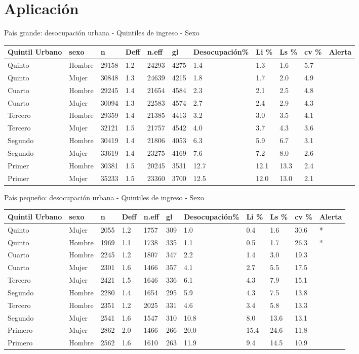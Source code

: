 \hypertarget{aplicacion}{%
\section{Aplicación}\label{aplicacion}}

País grande: desocupación urbana - Quintiles de ingreso - Sexo

\begin{longtable}[]{@{}lllllllllll@{}}
\toprule
Quintil Urbano & sexo & n & Deff & n.eff & gl & Desocupación\% & Li \% & Ls \% & cv \% & Alerta\tabularnewline
\midrule
\endhead
Quinto & Hombre & 29158 & 1.2 & 24293 & 4275 & 1.4 & 1.3 & 1.6 & 5.7 &\tabularnewline
Quinto & Mujer & 30848 & 1.3 & 24639 & 4215 & 1.8 & 1.7 & 2.0 & 4.9 &\tabularnewline
Cuarto & Hombre & 29245 & 1.4 & 21654 & 4584 & 2.3 & 2.1 & 2.5 & 4.8 &\tabularnewline
Cuarto & Mujer & 30094 & 1.3 & 22583 & 4574 & 2.7 & 2.4 & 2.9 & 4.3 &\tabularnewline
Tercero & Hombre & 29359 & 1.4 & 21385 & 4413 & 3.2 & 3.0 & 3.5 & 4.1 &\tabularnewline
Tercero & Mujer & 32121 & 1.5 & 21757 & 4542 & 4.0 & 3.7 & 4.3 & 3.6 &\tabularnewline
Segundo & Hombre & 30419 & 1.4 & 21806 & 4053 & 6.3 & 5.9 & 6.7 & 3.1 &\tabularnewline
Segundo & Mujer & 33619 & 1.4 & 23275 & 4169 & 7.6 & 7.2 & 8.0 & 2.6 &\tabularnewline
Primer & Hombre & 30381 & 1.5 & 20245 & 3531 & 12.7 & 12.1 & 13.3 & 2.4 &\tabularnewline
Primer & Mujer & 35233 & 1.5 & 23360 & 3700 & 12.5 & 12.0 & 13.0 & 2.1 &\tabularnewline
\bottomrule
\end{longtable}

País pequeño: desocupación urbana - Quintiles de ingreso - Sexo

\begin{longtable}[]{@{}lllllllllll@{}}
\toprule
Quintil Urbano & sexo & n & Deff & n.eff & gl & Desocupación\% & Li \% & Ls \% & cv \% & Alerta\tabularnewline
\midrule
\endhead
Quinto & Mujer & 2055 & 1.2 & 1757 & 309 & 1.0 & 0.4 & 1.6 & 30.6 & *\tabularnewline
Quinto & Hombre & 1969 & 1.1 & 1738 & 335 & 1.1 & 0.5 & 1.7 & 26.3 & *\tabularnewline
Cuarto & Hombre & 2245 & 1.2 & 1807 & 347 & 2.2 & 1.4 & 3.0 & 19.3 &\tabularnewline
Cuarto & Mujer & 2301 & 1.6 & 1466 & 357 & 4.1 & 2.7 & 5.5 & 17.5 &\tabularnewline
Tercero & Mujer & 2421 & 1.5 & 1646 & 336 & 6.1 & 4.3 & 7.9 & 15.1 &\tabularnewline
Segundo & Hombre & 2280 & 1.4 & 1654 & 295 & 5.9 & 4.3 & 7.5 & 13.8 &\tabularnewline
Tercero & Hombre & 2351 & 1.2 & 2025 & 331 & 4.6 & 3.4 & 5.8 & 13.3 &\tabularnewline
Segundo & Mujer & 2541 & 1.6 & 1547 & 310 & 10.8 & 8.0 & 13.6 & 13.1 &\tabularnewline
Primero & Mujer & 2862 & 2.0 & 1466 & 266 & 20.0 & 15.4 & 24.6 & 11.8 &\tabularnewline
Primero & Hombre & 2562 & 1.6 & 1610 & 263 & 11.9 & 9.4 & 14.5 & 10.9 &\tabularnewline
\bottomrule
\end{longtable}

